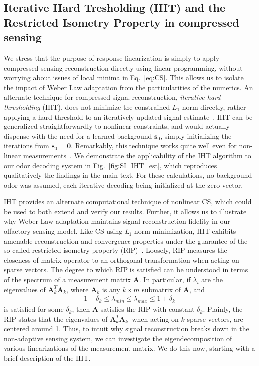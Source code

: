 \documentclass[9pt,twoside]{pnas-new}
\begin{document}
\subsection*{Iterative Hard Tresholding (IHT) and the Restricted Isometry Property in compressed sensing}
We stress that the purpose of response linearization is simply to apply compressed sensing reconstruction directly using linear programming, without worrying about issues of local minima in Eq.~\ref{eq:CS}. This allows us to isolate the impact  of Weber Law adaptation from the particularities of the numerics. An alternate technique for compressed signal reconstruction, \textit{iterative hard thresholding} (IHT), does not minimize the constrained $L_1$ norm directly, rather applying a hard threshold to an iteratively updated signal estimate~\cite{IHT}. IHT can be generalized straightforwardly to nonlinear constraints, and would actually dispense with the need for a learned background $\mathbf {s}_0$, simply initializing the iterations from $\mathbf {s}_0 = \mathbf 0$. Remarkably, this technique works quite well even for non-linear measurements~\cite{nonlin_CS}. We demonstrate the applicability of the IHT algorithm to our odor decoding system in Fig.~\ref{fig:SI_IHT_est}, which reproduces qualitatively the findings in the main text. For these calculations, no background odor was assumed, each iterative decoding being initialized at the zero vector. 

IHT provides an alternate computational technique of nonlinear CS, which could be used to both extend and verify our results. Further, it allows us to illustrate why Weber Law adaptation maintains signal reconstruction fidelity in our olfactory sensing model. Like CS using $L_1$-norm minimization, IHT exhibits amenable reconstruction and convergence properties under the guarantee of the so-called restricted isometry property (RIP)~\cite{CS_tao_2}. Loosely, RIP measures the closeness of matrix operator to an orthogonal transformation when acting on sparse vectors. The degree to which RIP is satisfied can be understood in terms of the spectrum of a measurement matrix $\mathbf A$. In particular, if $\lambda_i$ are the eigenvalues of $\mathbf {A}_k^T\mathbf {A}_k$, where $\mathbf A_k$ is any $k \times m$ submatrix of $\mathbf A$, and 
\begin{align*}
    1 - \delta_k \leq \lambda_{min} \leq \lambda_{max} \leq 1 + \delta_k
\end{align*}
is satisfied for some $\delta_k$, then $\mathbf A$ satisfies the RIP with constant $\delta_k$. Plainly, the RIP states that the eigenvalues of $\mathbf {A}_k^T\mathbf {A}_k$, when acting on $k$-sparse vectors, are centered around 1. Thus, to intuit why signal reconstruction breaks down in the non-adaptive sensing system, we can investigate the eigendecomposition of various linearizations of the measurement matrix. We do this now, starting with a brief description of the IHT.
\end{document}
